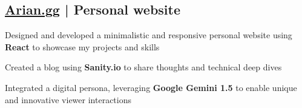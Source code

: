 


\subsection{\href{https://arian.gg}{Arian.gg} | Personal website }
\begin{zitemize}
    \item Designed and developed a minimalistic and responsive personal website using \textbf{React} to showcase my projects and skills
    \item Created a blog using \textbf{Sanity.io} to share thoughts and technical deep dives
    \item Integrated a digital persona, leveraging \textbf{Google Gemini 1.5} to enable unique and innovative viewer interactions

\end{zitemize}


